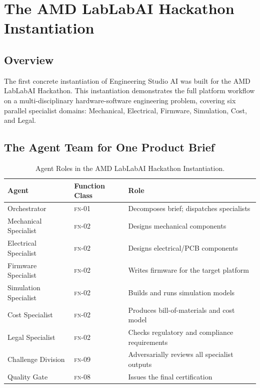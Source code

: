\documentclass[12pt]{article}
\newcommand{\FN}[1]{\textsc{fn-#1}}
\begin{document}
\section{The AMD LabLabAI Hackathon Instantiation}
\label{sec:hackathon}

\subsection{Overview}

The first concrete instantiation of Engineering Studio AI was built
for the AMD LabLabAI Hackathon.
This instantiation demonstrates the full platform workflow on a
multi-disciplinary hardware-software engineering problem, covering six
parallel specialist domains: Mechanical, Electrical, Firmware,
Simulation, Cost, and Legal.

\subsection{The Agent Team for One Product Brief}

\begin{table}[H]
\centering
\caption{Agent Roles in the AMD LabLabAI Hackathon Instantiation.}
\label{tab:hackathon-agents}
\begin{tabular}{@{}lll@{}}
\toprule
\textbf{Agent} & \textbf{Function Class} & \textbf{Role} \\
\midrule
Orchestrator           & \FN{01} & Decomposes brief; dispatches specialists \\
Mechanical Specialist  & \FN{02} & Designs mechanical components \\
Electrical Specialist  & \FN{02} & Designs electrical/PCB components \\
Firmware Specialist    & \FN{02} & Writes firmware for the target platform \\
Simulation Specialist  & \FN{02} & Builds and runs simulation models \\
Cost Specialist        & \FN{02} & Produces bill-of-materials and cost model \\
Legal Specialist       & \FN{02} & Checks regulatory and compliance requirements \\
Challenge Division     & \FN{09} & Adversarially reviews all specialist outputs \\
Quality Gate           & \FN{08} & Issues the final certification \\
\bottomrule
\end{tabular}
\end{table}
\end{document}
